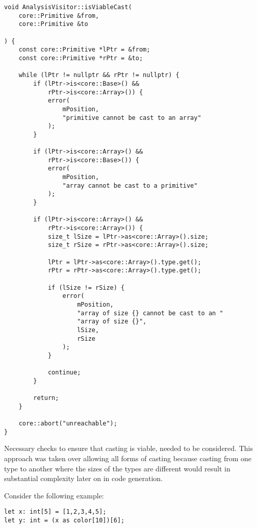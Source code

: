 \begin{lstlisting}[caption={The \texttt{isViableCast()} method
in the \texttt{AnalysisVisitor} class
(analysis/AnalysisVisitor.cpp).}]
void AnalysisVisitor::isViableCast(
    core::Primitive &from,
    core::Primitive &to

) {
    const core::Primitive *lPtr = &from;
    const core::Primitive *rPtr = &to;

    while (lPtr != nullptr && rPtr != nullptr) {
        if (lPtr->is<core::Base>() &&
            rPtr->is<core::Array>()) {
            error(
                mPosition,
                "primitive cannot be cast to an array"
            );
        }

        if (lPtr->is<core::Array>() &&
            rPtr->is<core::Base>()) {
            error(
                mPosition,
                "array cannot be cast to a primitive"
            );
        }

        if (lPtr->is<core::Array>() &&
            rPtr->is<core::Array>()) {
            size_t lSize = lPtr->as<core::Array>().size;
            size_t rSize = rPtr->as<core::Array>().size;

            lPtr = lPtr->as<core::Array>().type.get();
            rPtr = rPtr->as<core::Array>().type.get();

            if (lSize != rSize) {
                error(
                    mPosition,
                    "array of size {} cannot be cast to an "
                    "array of size {}",
                    lSize,
                    rSize
                );
            }

            continue;
        }

        return;
    }

    core::abort("unreachable");
}
\end{lstlisting}

Necessary checks to ensure that casting is viable, needed to be
considered. This approach was taken over allowing all forms of
casting because casting from one type to another where the sizes
of the types are different would result in substantial
complexity later on in code generation.

Consider the following example:

\begin{center}
\begin{minipage}[l]{0.54\linewidth}
\begin{lstlisting}[morekeywords={color}]
let x: int[5] = [1,2,3,4,5];
let y: int = (x as color[10])[6];
\end{lstlisting}
\end{minipage}
\end{center}

